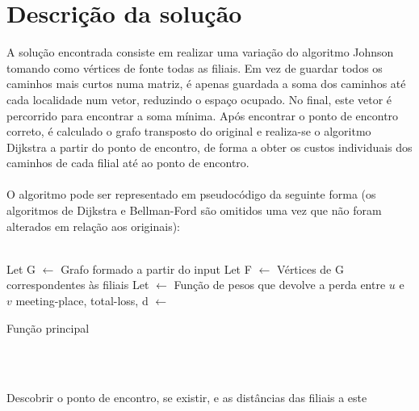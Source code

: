 \documentclass[12pt,a4paper,notitlepage]{article}
\begin{document}
\section{Descrição da solução}
A solução encontrada consiste em realizar uma variação do algoritmo Johnson tomando como vértices de fonte todas as filiais.
Em vez de guardar todos os caminhos mais curtos numa matriz, é apenas guardada a soma dos caminhos até cada localidade num vetor, reduzindo o espaço ocupado.
No final, este vetor é percorrido para encontrar a soma mínima. 
Após encontrar o ponto de encontro correto, é calculado o grafo transposto do original e realiza-se o algoritmo Dijkstra a partir do ponto de encontro, de forma a obter os custos individuais dos caminhos de cada filial até ao ponto de encontro.
\\
\\
O algoritmo pode ser representado em pseudocódigo da seguinte forma (os algoritmos de Dijkstra e Bellman-Ford são omitidos uma vez que não foram alterados em relação aos originais):
\\
\\
\begin{algorithm}
    Let G $\leftarrow$ Grafo formado a partir do input\;
    Let F $\leftarrow$ Vértices de G correspondentes às filiais\;
    Let  $\leftarrow$ Função de pesos que devolve a perda entre $u$ e $v$\;
    meeting-place, total-loss, d $\leftarrow$ \;
    {
        \;
    }
    \caption{Função principal}
\end{algorithm}
\\
\\
\begin{algorithm}[H]
    \caption{Descobrir o ponto de encontro, se existir, e as distâncias das filiais a este}
\end{algorithm}
\pagebreak
\end{document}
